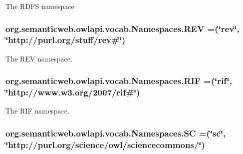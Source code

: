 The R\-D\-F\-S namespace \hypertarget{enumorg_1_1semanticweb_1_1owlapi_1_1vocab_1_1_namespaces_a1352667cd590e0b54c21a40d31cd9537}{
\subsubsection[{R\-E\-V}]{\setlength{\rightskip}{0pt plus 5cm}org.\-semanticweb.\-owlapi.\-vocab.\-Namespaces.\-R\-E\-V =(\char`\"{}rev\char`\"{}, \char`\"{}http\-://purl.\-org/stuff/rev\#\char`\"{})}}\label{enumorg_1_1semanticweb_1_1owlapi_1_1vocab_1_1_namespaces_a1352667cd590e0b54c21a40d31cd9537}
The R\-E\-V namespace. \hypertarget{enumorg_1_1semanticweb_1_1owlapi_1_1vocab_1_1_namespaces_a3c0a9110ee538f30bded5dfed0da95d3}{
\subsubsection[{R\-I\-F}]{\setlength{\rightskip}{0pt plus 5cm}org.\-semanticweb.\-owlapi.\-vocab.\-Namespaces.\-R\-I\-F =(\char`\"{}rif\char`\"{}, \char`\"{}http\-://www.\-w3.\-org/2007/rif\#\char`\"{})}}\label{enumorg_1_1semanticweb_1_1owlapi_1_1vocab_1_1_namespaces_a3c0a9110ee538f30bded5dfed0da95d3}
The R\-I\-F namespace. \hypertarget{enumorg_1_1semanticweb_1_1owlapi_1_1vocab_1_1_namespaces_a46f8b8ebe04947918ee99fc31e5899dd}{
\subsubsection[{S\-C}]{\setlength{\rightskip}{0pt plus 5cm}org.\-semanticweb.\-owlapi.\-vocab.\-Namespaces.\-S\-C =(\char`\"{}sc\char`\"{}, \char`\"{}http\-://purl.\-org/science/owl/sciencecommons/\char`\"{})}}\label{enumorg_1_1semanticweb_1_1owlapi_1_1vocab_1_1_namespaces_a46f8b8ebe04947918ee99fc31e5899dd}
